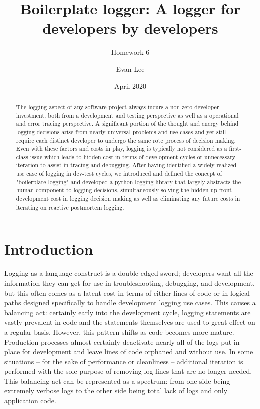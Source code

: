 \documentclass[acmsmall,review,authorversion]{acmart}
\title{Boilerplate logger: A logger for developers by developers}
\subtitle{Homework 6}
\author{Evan Lee}
\affiliation{%
    \institution{University of Colorado Boulder}
    \city{Boulder}
    \state{Colorado}
}
\date{April 2020}
\begin{document}
\begin{abstract}
    The logging aspect of any software project always incurs a non-zero developer investment, both from a development and testing perspective as well as a operational and error tracing perspective. A significant portion of the thought and energy behind logging decisions arise from nearly-universal problems and use cases and yet still require each distinct developer to undergo the same rote process of decision making. Even with these factors and costs in play, logging is typically not considered as a first-class issue which leads to hidden cost in terms of development cycles or unnecessary iteration to assist in tracing and debugging. After having identified a widely realized use case of logging in dev-test cycles, we introduced and defined the concept of "boilerplate logging" and developed a python logging library that largely abstracts the human component to logging decisions, simultaneously solving the hidden up-front development cost in logging decision making as well as eliminating any future costs in iterating on reactive postmortem logging.
\end{abstract}

\maketitle

\section{Introduction}

    Logging as a language construct is a double-edged sword; developers want all the information they can get for use in troubleshooting, debugging, and development, but this often comes as a latent cost in terms of either lines of code or in logical paths designed specifically to handle development logging use cases. This causes a balancing act: certainly early into the development cycle, logging statements are vastly prevalent in code and the statements themselves are used to great effect on a regular basis. However, this pattern shifts as code becomes more mature. Production processes almost certainly deactivate nearly all of the logs put in place for development and leave lines of code orphaned and without use. In some situations -- for the sake of performance or cleanliness -- additional iteration is performed with the sole purpose of removing log lines that are no longer needed. This balancing act can be represented as a spectrum: from one side being extremely verbose logs to the other side being total lack of logs and only application code.
\end{document}
